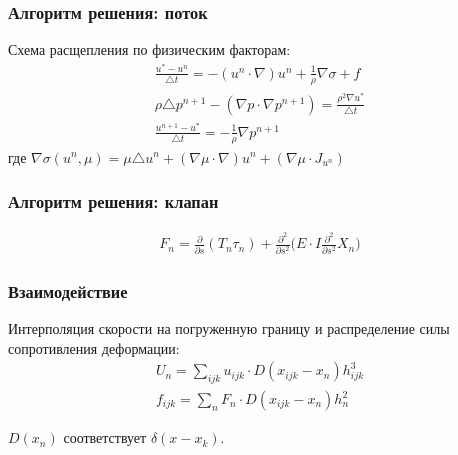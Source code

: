 \documentclass[14pt]{beamer}
\begin{document}
\begin{frame}
\frametitle{Алгоритм решения: поток}
Схема расщепления по физическим факторам:
\begin{gather}
    \label{eq:split_first}
    \frac{u^* - u^n}{\triangle t} = - (u^n \cdot \nabla) u^n + \frac{1}{\rho} \nabla \sigma + f\\
    \label{eq:split_second}
    \rho \triangle p^{n+1} - (\nabla p \cdot \nabla p^{n+1}) = \frac{\rho^2 \nabla u^*}{\triangle t}\\
    \label{eq:split_third}
    \frac{u^{n+1} - u^*}{\triangle t} = - \frac{1}{\rho} \nabla p^{n+1}
\end{gather}
где $\nabla \sigma (u^n, \mu) = \mu \triangle u^n + (\nabla \mu \cdot \nabla) u^n + (\nabla \mu \cdot J_{u^n}) $
\end{frame}

\begin{frame}
\frametitle{Алгоритм решения: клапан}
\begin{gather}
    \label{eq:strain_energy}
    F_{n} =  \frac{\partial}{\partial s}(T_{n} \tau_{n}) + \frac{\partial^2}{\partial s^2} \Big( E \cdot I \frac{\partial^2}{\partial s^2} X_{n} \Big)
\end{gather}
\end{frame}

\begin{frame}
\frametitle{Взаимодействие}
Интерполяция скорости на погруженную границу и распределение силы сопротивления деформации:
\begin{gather}
    \label{eq:interpolation}
    U_n = \sum_{ijk}u_{ijk} \cdot D(x_{ijk} - x_n) h_{ijk}^3 \\
    \label{eq:spreading}
    f_{ijk} = \sum_n F_n \cdot D(x_{ijk} - x_n) h^2_n
\end{gather}

$D(x_n)$ соответствует $\delta(x - x_k)$.
\end{frame}
\end{document}
